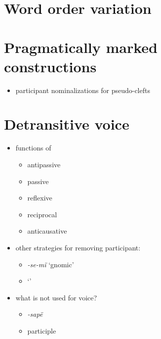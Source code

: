 \documentclass{memoir}
\begin{document}
\chapter{\texorpdfstring{Word order variation
\label{wordorder}}{Word order variation }}

\chapter{\texorpdfstring{Pragmatically marked constructions
\label{pragmarked}}{Pragmatically marked constructions }}

\begin{itemize}
\tightlist
\item
  participant nominalizations for pseudo-clefts
\end{itemize}

\chapter{\texorpdfstring{Detransitive voice
\label{voice}}{Detransitive voice }}

\begin{itemize}
\tightlist
\item
  functions of 

  \begin{itemize}
  \tightlist
  \item
    antipassive
  \item
    passive
  \item
    reflexive
  \item
    reciprocal
  \item
    anticausative
  \end{itemize}
\item
  other strategies for removing participant:

  \begin{itemize}
  \tightlist
  \item
    \emph{-se-mï} `gnomic'
  \item
     `'
  \end{itemize}
\item
  what is not used for voice?

  \begin{itemize}
  \tightlist
  \item
    \emph{-sapë}
  \item
    participle
  \end{itemize}
\end{itemize}

\printbibliography
\end{document}

